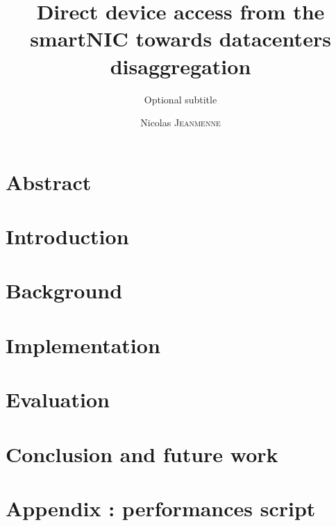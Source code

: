 \documentclass{template/EPL-master-thesis-covers-EN}
\title{Direct device access from the smartNIC towards datacenters disaggregation}
\subtitle{Optional subtitle}
\author{Nicolas \textsc{Jeanmenne}}
\begin{document}
\maketitle

\pagestyle{empty}

\chapter*{Abstract}

    

\pagestyle{empty}

\setcounter{tocdepth}{4}
\tableofcontents
\thispagestyle{empty}
\newpage

\printglossary[title= List of acronyms, type=\acronymtype]
\thispagestyle{empty}
\newpage
\listoflistings
\thispagestyle{empty}
\newpage

\chapter{Introduction}
\setcounter{page}{1}
\pagestyle{plain}

    


\chapter{Background} \label{ch:background}

    

\chapter{Implementation} \label{ch:implementation}

    

\chapter{Evaluation} \label{ch:evaluation}

    


\chapter{Conclusion and future work} \label{ch:conclusion}

    

\chapter{Appendix : performances script} \label{ch:perfs-scripts}
\setcounter{page}{1}

    


\printbibliography[heading=bibintoc]

\backcoverpage
\end{document}
